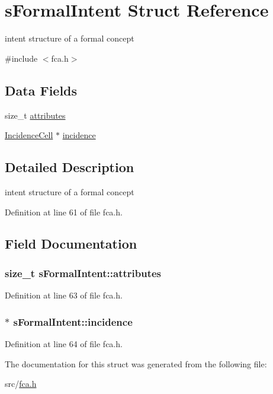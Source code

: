 \hypertarget{structsFormalIntent}{\section{s\-Formal\-Intent \-Struct \-Reference}
\label{structsFormalIntent}
}


intent structure of a formal concept  




{\ttfamily \#include $<$fca.\-h$>$}

\subsection*{\-Data \-Fields}
\begin{DoxyCompactItemize}
\item 
size\-\_\-t \hyperlink{structsFormalIntent_a74e2f2885fae7bdfe1ecf1b3a161d625}{attributes}
\item 
\hyperlink{fca_8h_a92fa84ef7a12663bb998f141ab729056}{\-Incidence\-Cell} $\ast$ \hyperlink{structsFormalIntent_a81eeab9acf7444b47416e4b72dea0462}{incidence}
\end{DoxyCompactItemize}


\subsection{\-Detailed \-Description}
intent structure of a formal concept 

\-Definition at line 61 of file fca.\-h.



\subsection{\-Field \-Documentation}
\hypertarget{structsFormalIntent_a74e2f2885fae7bdfe1ecf1b3a161d625}{
\subsubsection[{attributes}]{\setlength{\rightskip}{0pt plus 5cm}size\-\_\-t {\bf s\-Formal\-Intent\-::attributes}}}\label{structsFormalIntent_a74e2f2885fae7bdfe1ecf1b3a161d625}


\-Definition at line 63 of file fca.\-h.

\hypertarget{structsFormalIntent_a81eeab9acf7444b47416e4b72dea0462}{
\subsubsection[{incidence}]{$\ast$ {\bf s\-Formal\-Intent\-::incidence}}}\label{structsFormalIntent_a81eeab9acf7444b47416e4b72dea0462}


\-Definition at line 64 of file fca.\-h.



\-The documentation for this struct was generated from the following file\-:\begin{DoxyCompactItemize}
\item 
src/\hyperlink{fca_8h}{fca.\-h}\end{DoxyCompactItemize}
